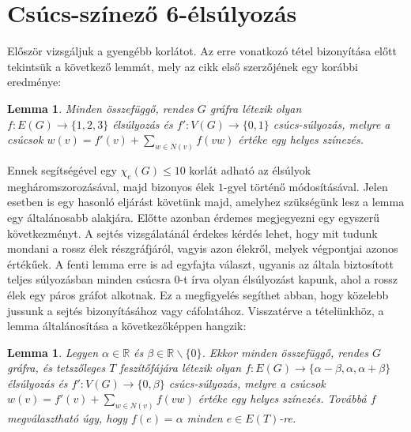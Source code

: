 \documentclass[12pt, a4paper]{report}
\newtheorem{lem}[tét]{Lemma}
\theoremstyle{remark}
\theoremstyle{definition}
\begin{document}
\section{Csúcs-színező 6-élsúlyozás}
Először vizsgáljuk a gyengébb korlátot. Az erre vonatkozó tétel bizonyítása előtt tekintsük a következő lemmát, mely az \cite{Kalkowski2009} cikk első szerzőjének egy korábbi eredménye:

\begin{lem}
Minden összefüggő, rendes $G$ gráfra létezik olyan $f:E(G) \rightarrow \lbrace 1, 2, 3 \rbrace$ élsúlyozás és $f':V(G) \rightarrow \lbrace 0, 1 \rbrace$ csúcs-súlyozás, melyre a csúcsok $w(v) = f'(v) + \sum\limits_{w \in N(v)} f(vw)$ értéke egy helyes színezés.
\end{lem}

Ennek segítségével egy $\chi_e(G) \leq 10$ korlát adható az élsúlyok megháromszorozásával, majd bizonyos élek $1$-gyel történő módosításával. Jelen esetben is egy hasonló eljárást követünk majd, amelyhez szükségünk lesz a lemma egy általánosabb alakjára. Előtte azonban érdemes megjegyezni egy egyszerű következményt. A sejtés vizsgálatánál érdekes kérdés lehet, hogy mit tudunk mondani a rossz élek részgráfjáról, vagyis azon élekről, melyek végpontjai azonos értékűek. A fenti lemma erre is ad egyfajta választ, ugyanis az általa biztosított teljes súlyozásban minden csúcsra $0$-t írva olyan élsúlyozást kapunk, ahol a rossz élek egy páros gráfot alkotnak. Ez a megfigyelés segíthet abban, hogy közelebb jussunk a sejtés bizonyításához vagy cáfolatához. Visszatérve a tételünkhöz, a lemma általánosítása a következőképpen hangzik:

\begin{lem}
Legyen $\alpha \in \mathbb{R}$ és $\beta \in \mathbb{R} \smallsetminus \lbrace 0 \rbrace$. Ekkor minden összefüggő, rendes $G$ gráfra, és tetszőleges $T$ feszítőfájára létezik olyan $f:E(G) \rightarrow \lbrace \alpha - \beta, \alpha, \alpha + \beta \rbrace$ élsúlyozás és $f':V(G) \rightarrow \lbrace 0, \beta \rbrace$ csúcs-súlyozás, melyre a csúcsok $w(v) = f'(v) + \sum\limits_{w \in N(v)} f(vw)$ értéke egy helyes színezés. Továbbá $f$ megválasztható úgy, hogy $f(e) = \alpha$ minden $e \in E(T)$-re.
\end{lem}
\end{document}
